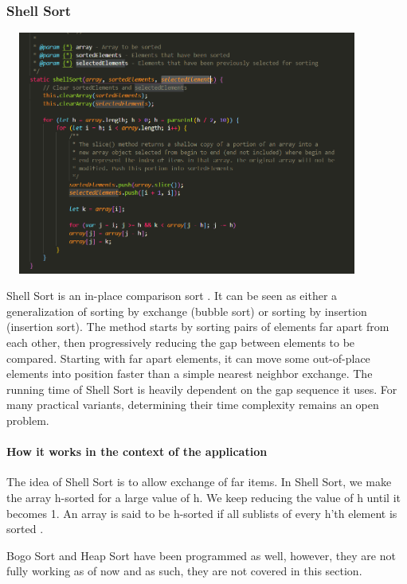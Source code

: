 \subsubsection{Shell Sort}
\begin{center}
    \includegraphics[width=12cm,height=8cm,keepaspectratio]{images/shellsort}
\end{center}
Shell Sort is an in-place comparison sort \cite{shell_sort}. It can be seen as either a generalization of sorting by exchange (bubble sort) or sorting by insertion (insertion sort). The method starts by sorting pairs of elements far apart from each other, then progressively reducing the gap between elements to be compared. Starting with far apart elements, it can move some out-of-place elements into position faster than a simple nearest neighbor exchange. The running time of Shell Sort is heavily dependent on the gap sequence it uses. For many practical variants, determining their time complexity remains an open problem.
\par
\bigskip

\paragraph{How it works in the context of the application}
The idea of Shell Sort is to allow exchange of far items. In Shell Sort, we make the array h-sorted for a large value of h. We keep reducing the value of h until it becomes 1. An array is said to be h-sorted if all sublists of every h’th element is sorted \cite{shell_sort_geeks}.
\par
\bigskip
Bogo Sort and Heap Sort have been programmed as well, however, they are not fully working as of now and as such, they are not covered in this section.

